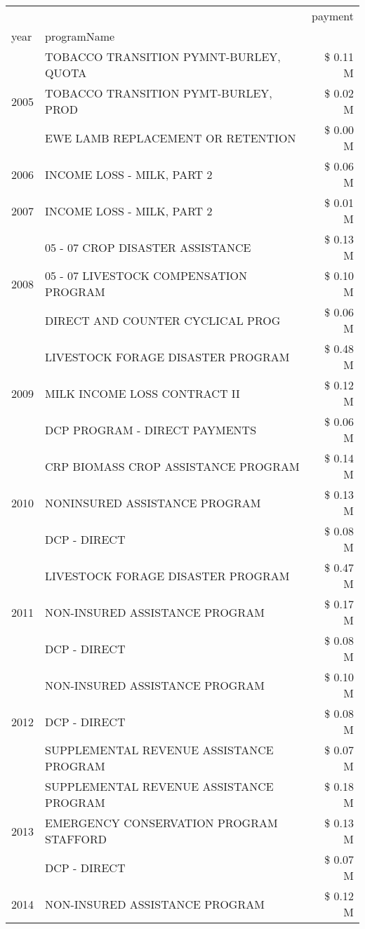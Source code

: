 \begin{tabular}{llr}
\toprule
 &  & payment \\
year & programName &  \\
\midrule
\multirow[t]{3}{*}{2005} & TOBACCO TRANSITION PYMNT-BURLEY, QUOTA & \$ 0.11 M \\
 & TOBACCO TRANSITION PYMT-BURLEY, PROD & \$ 0.02 M \\
 & EWE LAMB REPLACEMENT OR RETENTION & \$ 0.00 M \\
\cline{1-3}
2006 & INCOME LOSS - MILK, PART 2 & \$ 0.06 M \\
\cline{1-3}
2007 & INCOME LOSS - MILK, PART 2 & \$ 0.01 M \\
\cline{1-3}
\multirow[t]{3}{*}{2008} & 05 - 07 CROP DISASTER ASSISTANCE & \$ 0.13 M \\
 & 05 - 07 LIVESTOCK COMPENSATION PROGRAM & \$ 0.10 M \\
 & DIRECT AND COUNTER CYCLICAL PROG & \$ 0.06 M \\
\cline{1-3}
\multirow[t]{3}{*}{2009} & LIVESTOCK FORAGE DISASTER  PROGRAM & \$ 0.48 M \\
 & MILK INCOME LOSS CONTRACT II & \$ 0.12 M \\
 & DCP PROGRAM - DIRECT PAYMENTS & \$ 0.06 M \\
\cline{1-3}
\multirow[t]{3}{*}{2010} & CRP BIOMASS CROP ASSISTANCE PROGRAM & \$ 0.14 M \\
 & NONINSURED ASSISTANCE PROGRAM & \$ 0.13 M \\
 & DCP - DIRECT & \$ 0.08 M \\
\cline{1-3}
\multirow[t]{3}{*}{2011} & LIVESTOCK FORAGE DISASTER PROGRAM & \$ 0.47 M \\
 & NON-INSURED ASSISTANCE PROGRAM & \$ 0.17 M \\
 & DCP - DIRECT & \$ 0.08 M \\
\cline{1-3}
\multirow[t]{3}{*}{2012} & NON-INSURED ASSISTANCE PROGRAM & \$ 0.10 M \\
 & DCP - DIRECT & \$ 0.08 M \\
 & SUPPLEMENTAL REVENUE ASSISTANCE PROGRAM & \$ 0.07 M \\
\cline{1-3}
\multirow[t]{3}{*}{2013} & SUPPLEMENTAL REVENUE ASSISTANCE PROGRAM & \$ 0.18 M \\
 & EMERGENCY CONSERVATION PROGRAM STAFFORD & \$ 0.13 M \\
 & DCP - DIRECT & \$ 0.07 M \\
\cline{1-3}
\multirow[t]{3}{*}{2014} & NON-INSURED ASSISTANCE PROGRAM & \$ 0.12 M \\

\end{tabular}

